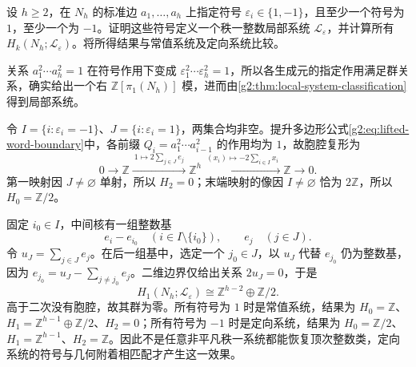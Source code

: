 \begin{exercise}\label{g2:ex:surface-other-sign-systems}
	设 \(h\geq2\)，在 \(N_h\) 的标准边 \(a_1,\ldots,a_h\) 上指定符号 \(\varepsilon_i\in\{1,-1\}\)，且至少一个符号为 \(1\)，至少一个为 \( -1\)。证明这些符号定义一个秩一整数局部系统 \(\mathcal L_\varepsilon\)，并计算所有 \(H_k(N_h;\mathcal L_\varepsilon)\)。将所得结果与常值系统及定向系统比较。
\end{exercise}
\begin{solution}
	关系 \(a_1^2\cdots a_h^2=1\) 在符号作用下变成 \(\varepsilon_1^2\cdots\varepsilon_h^2=1\)，所以各生成元的指定作用满足群关系，确实给出一个右 \(\mathbb Z[\pi_1(N_h)]\) 模，进而由\cref{g2:thm:local-system-classification}得到局部系统。

	令 \(I=\{i:\varepsilon_i=-1\}\)、\(J=\{i:\varepsilon_i=1\}\)，两集合均非空。提升多边形公式\eqref{g2:eq:lifted-word-boundary}中，各前缀 \(Q_i=a_1^2\cdots a_{i-1}^2\) 的作用均为 \(1\)，故胞腔复形为
	\[
		0\longrightarrow\mathbb Z
		\xrightarrow{\ 1\mapsto2\sum_{j\in J}e_j\ }\mathbb Z^h
		\xrightarrow{\ (x_i)\mapsto-2\sum_{i\in I}x_i\ }\mathbb Z
		\longrightarrow0.
	\]
	第一映射因 \(J\ne\varnothing\) 单射，所以 \(H_2=0\)；末端映射的像因 \(I\ne\varnothing\) 恰为 \(2\mathbb Z\)，所以 \(H_0=\mathbb Z/2\)。

	固定 \(i_0\in I\)，中间核有一组整数基
	\[
		e_i-e_{i_0}\quad(i\in I\setminus\{i_0\}),\qquad e_j\quad(j\in J).
	\]
	令 \(u_J=\sum_{j\in J}e_j\)。在后一组基中，选定一个 \(j_0\in J\)，以 \(u_J\) 代替 \(e_{j_0}\) 仍为整数基，因为 \(e_{j_0}=u_J-\sum_{j\ne j_0}e_j\)。二维边界仅给出关系 \(2u_J=0\)，于是
	\[
		H_1(N_h;\mathcal L_\varepsilon)\cong\mathbb Z^{h-2}\oplus\mathbb Z/2.
	\]
	高于二次没有胞腔，故其群为零。所有符号为 \(1\) 时是常值系统，结果为 \(H_0=\mathbb Z\)、\(H_1=\mathbb Z^{h-1}\oplus\mathbb Z/2\)、\(H_2=0\)；所有符号为 \( -1\) 时是定向系统，结果为 \(H_0=\mathbb Z/2\)、\(H_1=\mathbb Z^{h-1}\)、\(H_2=\mathbb Z\)。因此不是任意非平凡秩一系统都能恢复顶次整数类，定向系统的符号与几何附着相匹配才产生这一效果。
\end{solution}

